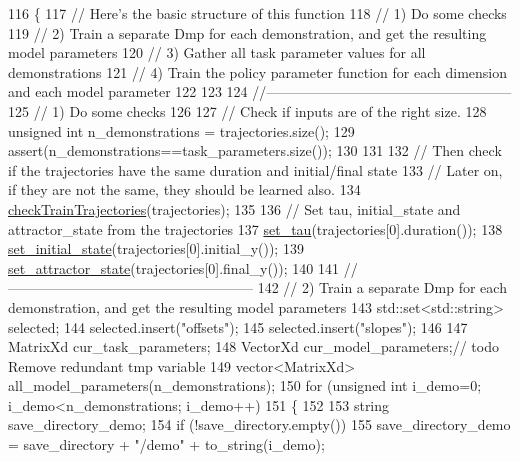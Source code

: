 \begin{DoxyCode}
116 \{
117   \textcolor{comment}{// Here's the basic structure of this function}
118   \textcolor{comment}{// 1) Do some checks}
119   \textcolor{comment}{// 2) Train a separate Dmp for each demonstration, and get the resulting model parameters}
120   \textcolor{comment}{// 3) Gather all task parameter values for all demonstrations}
121   \textcolor{comment}{// 4) Train the policy parameter function for each dimension and each model parameter}
122   
123   
124   \textcolor{comment}{//-----------------------------------------------------}
125   \textcolor{comment}{// 1) Do some checks}
126   
127   \textcolor{comment}{// Check if inputs are of the right size.}
128   \textcolor{keywordtype}{unsigned} \textcolor{keywordtype}{int} n\_demonstrations = trajectories.size();
129   assert(n\_demonstrations==task\_parameters.size());  
130   
131   
132   \textcolor{comment}{// Then check if the trajectories have the same duration and initial/final state}
133   \textcolor{comment}{// Later on, if they are not the same, they should be learned also.}
134   \hyperlink{classDmpBbo_1_1DmpContextual_aba2e356cdf0cfe688fdcf02ffe68c4d2}{checkTrainTrajectories}(trajectories);
135 
136   \textcolor{comment}{// Set tau, initial\_state and attractor\_state from the trajectories }
137   \hyperlink{classDmpBbo_1_1Dmp_a17edb45ef62a4ef7f8c78e4f8f68b249}{set\_tau}(trajectories[0].duration());
138   \hyperlink{classDmpBbo_1_1Dmp_ad4e11c676c2add8a992db1caf542f0a0}{set\_initial\_state}(trajectories[0].initial\_y());
139   \hyperlink{classDmpBbo_1_1Dmp_a6dccbd077acfd148f528a48a72a4003f}{set\_attractor\_state}(trajectories[0].final\_y());
140 
141   \textcolor{comment}{//-----------------------------------------------------}
142   \textcolor{comment}{// 2) Train a separate Dmp for each demonstration, and get the resulting model parameters}
143   std::set<std::string> selected;
144   selected.insert(\textcolor{stringliteral}{"offsets"});
145   selected.insert(\textcolor{stringliteral}{"slopes"});
146   
147   MatrixXd cur\_task\_parameters;
148   VectorXd cur\_model\_parameters;\textcolor{comment}{// todo Remove redundant tmp variable}
149   vector<MatrixXd> all\_model\_parameters(n\_demonstrations); 
150   \textcolor{keywordflow}{for} (\textcolor{keywordtype}{unsigned} \textcolor{keywordtype}{int} i\_demo=0; i\_demo<n\_demonstrations; i\_demo++)
151   \{
152     
153     \textcolor{keywordtype}{string} save\_directory\_demo;
154     \textcolor{keywordflow}{if} (!save\_directory.empty())
155       save\_directory\_demo = save\_directory + \textcolor{stringliteral}{"/demo"} + to\_string(i\_demo);

\end{DoxyCode}
